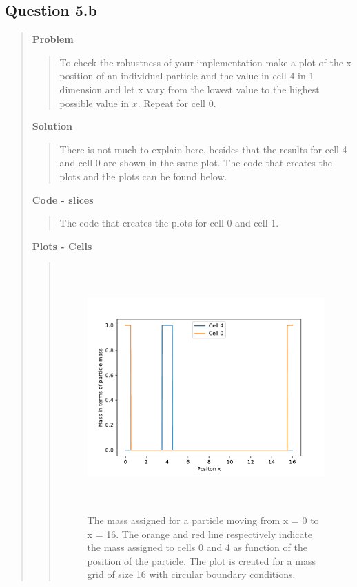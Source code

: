 
\subsection*{\textbf{Question 5.b}}
\begin{quote}

\textbf{Problem}
\begin{quote}
To check the robustness of your implementation make a plot of the x position of an individual particle and the value in cell 4 in 1 dimension and let x vary from the lowest value to the highest possible value in $x$. Repeat for cell 0.
\end{quote}

\textbf{Solution} 
\begin{quote}
There is not much to explain here, besides that the results for cell 4 and cell 0 are shown in the same plot. The code that creates the plots and the plots can be found below.

\end{quote}

\textbf{Code - slices}
\begin{quote}
The code that creates the plots for cell 0 and cell 1.

\end{quote}
\newpage
\textbf{Plots - Cells}
\begin{quote}
\begin{figure}[!ht]
\centering
\includegraphics[width=14cm, height=9.5cm]{./Plots/5b_cell.pdf}
\caption{The mass assigned for a particle moving from x = 0 to x = 16. The orange and red line respectively indicate the mass assigned to cells 0 and 4 as function of the position of the particle. The plot is created for a mass grid of size 16 with circular boundary conditions.  }
\end{figure}

\end{quote}
\end{quote}











